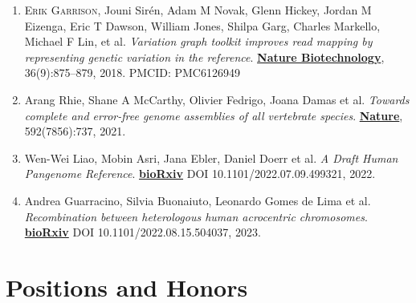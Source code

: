 \documentclass{nihbiosketch}
\newcommand{\hijournal}[1]{{\bf {\uline{#1}}}}
\begin{document}
\begin{statement}
\begin{enumerate}[label=\alph*.]
\item \textsc{Erik Garrison}, Jouni Sirén, Adam M Novak, Glenn Hickey, Jordan M Eizenga, Eric T Dawson, William Jones, Shilpa Garg, Charles Markello, Michael F Lin, et al. \emph{Variation graph toolkit improves read mapping by representing genetic variation in the reference}. \hijournal{Nature Biotechnology}, 36(9):875–879, 2018. PMCID: PMC6126949




\item Arang Rhie, Shane A McCarthy, Olivier Fedrigo, Joana Damas et al. \emph{Towards complete and error-free genome assemblies of all vertebrate species}. \hijournal{Nature}, 592(7856):737, 2021.

\item Wen-Wei Liao, Mobin Asri, Jana Ebler, Daniel Doerr et al. \emph{A Draft Human Pangenome Reference}. \hijournal{bioRxiv} DOI 10.1101/2022.07.09.499321, 2022.

\item Andrea Guarracino, Silvia Buonaiuto, Leonardo Gomes de Lima et al. \emph{Recombination between heterologous human acrocentric chromosomes}. \hijournal{bioRxiv} DOI 10.1101/2022.08.15.504037, 2023.

\end{enumerate}

\end{statement}

\section{Positions and Honors}
\end{document}

